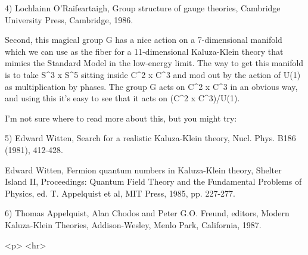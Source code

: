 4) Lochlainn O'Raifeartaigh, Group structure of gauge theories, 
Cambridge University Press, Cambridge, 1986.

Second, this magical group G has a nice action on a 7-dimensional 
manifold which we can use as the fiber for a 11-dimensional Kaluza-Klein 
theory that mimics the Standard Model in the low-energy limit.  The way 
to get this manifold is to take S^3 x S^5 sitting inside C^2 x C^3 and 
mod out by the action of U(1) as multiplication by phases.  The group 
G acts on C^2 x C^3 in an obvious way, and using this it's easy to see 
that it acts on (C^2 x C^3)/U(1).  

I'm not sure where to read more about this, but you might try:

5) Edward Witten, Search for a realistic Kaluza-Klein theory, 
Nucl. Phys. B186 (1981), 412-428.

Edward Witten, Fermion quantum numbers in Kaluza-Klein theory, 
Shelter Island II, Proceedings: Quantum Field Theory and the 
Fundamental Problems of Physics, ed. T. Appelquist et al, 
MIT Press, 1985, pp. 227-277.


6) Thomas Appelquist, Alan Chodos and Peter G.O. Freund, editors,
Modern Kaluza-Klein Theories, Addison-Wesley, Menlo Park, California,
1987.

<p> <hr>



